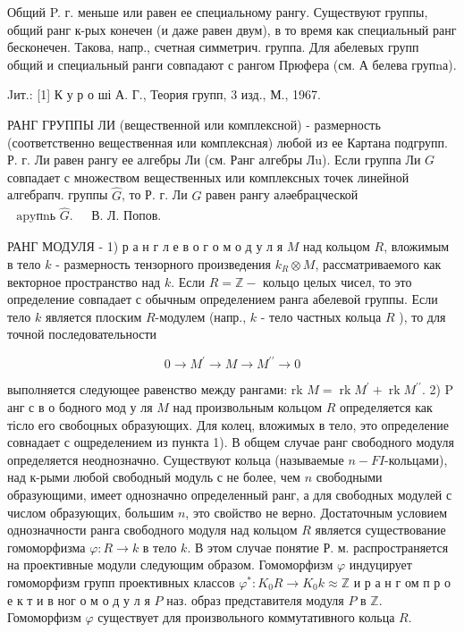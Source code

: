 \documentclass[10pt]{article}
\begin{document}
Общий P. г. меньше или равен ее специальному рангу. Существуют группы, общий ранг к-рых конечен (и даже равен двум), в то время как специальный ранг бесконечен. Такова, напр., счетная симметрич. группа. Для абелевых групп общий и специальный ранги совпадают с рангом Прюфера (см. А белева групnа).



Jит.: [1] К у р о ші А. Г., Теория групп, 3 изд., М., 1967.



РАНГ ГРУППЫ ЛИ (вещественной или комплексной) - размерность (соответственно вещественная или комплексная) любой из ее Картана подгрупп. Р. г. Ли равен рангу ее алгебры Ли (см. Ранг алгебры Лu). Если группа Ли $G$ совпадает с множеством вещественных или комплексных точек линейной алгебрапч. группы $\widehat{G}$, то Р. г. Ли $G$ равен рангу аләебрацческой $\begin{array}{ll}\text { apyпnь } \hat{G} \text {. } & \text { В. Л. Попов. }\end{array}$



РАНГ МОДУЛЯ - 1) р а н г л е в о г о м о д у л я $M$ над кольцом $R$, вложимым в тело $k$ - размерность тензорного произведения $k_{R} \otimes M$, рассматриваемого как векторное пространство над $k$. Если $R=\mathbb{Z}-$ кольцо целых чисел, то это определение совпадает с обычным определением ранга абелевой группы. Если тело $k$ является плоским $R$-модулем (напр., $k$ - тело частных кольца $R$ ), то для точной последовательности



\[

0 \longrightarrow M^{\prime} \longrightarrow M \longrightarrow M^{\prime \prime} \longrightarrow 0

\]



выполняется следующее равенство между рангами: rk $M=\operatorname{rk} M^{\prime}+\operatorname{rk} M^{\prime \prime}$. 2) $\mathrm{P}$ анг с в о бодного мод у ля $M$ над произвольным кольцом $R$ определяется как тісло его свобоцных образующих. Для колец, вложимых в тело, это определение совнадает с ощределением из пункта 1). В общем случае ранг свободного модуля определяется неоднозначно. Существуют кольца (называемые $n-F I$-кольцами), над к-рыми любой свободный модуль с не более, чем $n$ свободными образующими, имеет однозначно определенный ранг, а для свободных модулей с числом образующих, большим $n$, это свойство не верно. Достаточным условием однозначности ранга свободного модуля над кольцом $R$ является существование гомоморфизма $\varphi: R \rightarrow k$ в тело $k$. В этом случае понятие Р. м. распространяется на проективные модули следующим образом. Гомоморфизм $\varphi$ индуцирует гомоморфизм групп проективных классов $\varphi^{*}: K_{0} R \rightarrow K_{0} k \approx \mathbb{Z}$ и р а н г ом п р о е к т и в ног о м о д у л я $P$ наз. образ представителя модуля $P$ в $\mathbb{Z}$. Гомоморфизм $\varphi$ существует для произвольного коммутативного кольца $R$.
\end{document}
